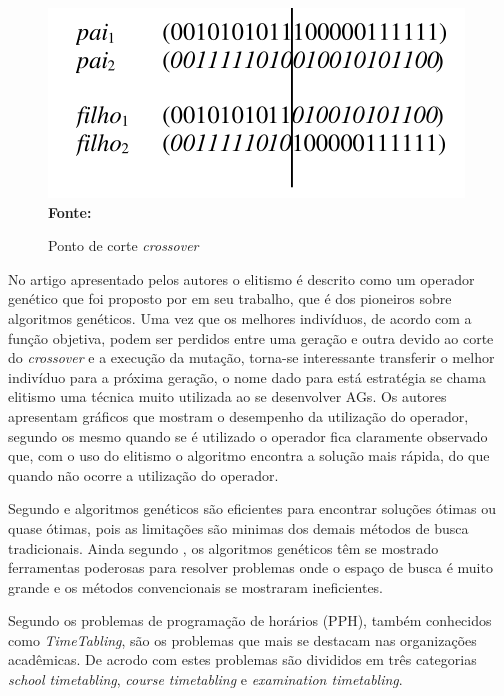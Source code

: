 \documentclass{abntpuc}
\begin{document}
\begin{figure}[!htb]
\caption[Ponto de corte \textit{crossover}]{Ponto de corte \textit{crossover}}
\label{fig:pontoCorteAG}
\centering
\includegraphics[scale=0.6]{imagens/crossoverAG.png}
\\ \textbf{\footnotesize Fonte: \cite{de1999introduccao}}
\end{figure}

No artigo apresentado pelos autores \cite{de1999introduccao} o elitismo é descrito como um operador genético que foi proposto por \cite{DeJong} em seu trabalho, que é dos pioneiros sobre algoritmos genéticos. Uma vez que os melhores indivíduos, de acordo com a função objetiva, podem ser perdidos entre uma geração e outra devido ao corte do \textit{crossover} e a execução da mutação, torna-se interessante transferir o melhor indivíduo para a próxima geração, o nome dado para está estratégia se chama elitismo uma técnica muito utilizada ao se desenvolver AGs. Os autores apresentam gráficos que mostram o desempenho da utilização do operador, segundo os mesmo quando se é utilizado o operador fica claramente observado que, com o uso do elitismo o algoritmo encontra a solução mais rápida, do que quando não ocorre a utilização do operador.

Segundo \cite{hamawaki2011geraccao} e \cite{oliveira2005algoritmo} algoritmos genéticos são eficientes para encontrar soluções ótimas ou quase ótimas, pois as limitações são minimas dos demais métodos de busca tradicionais. Ainda segundo \cite{oliveira2005algoritmo}, os algoritmos genéticos têm se mostrado ferramentas poderosas para resolver problemas onde o espaço de busca é muito grande e os métodos convencionais se mostraram ineficientes.\par



Segundo \cite{kripkasimulated} os problemas de programação de horários (PPH), também conhecidos como \textit{TimeTabling}, são os problemas que mais se destacam nas organizações acadêmicas. De acrodo com \cite{schaerf1999survey} estes problemas são divididos em três categorias \textit{school timetabling}, \textit{course timetabling} e \textit{examination timetabling}.\par
\end{document}
